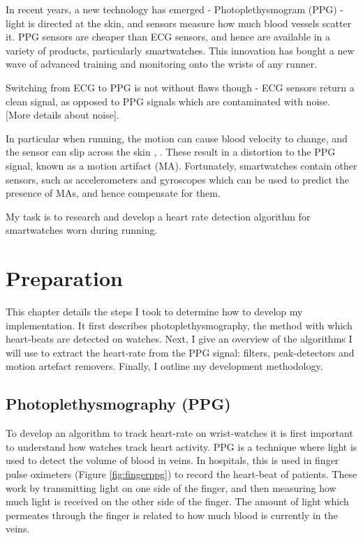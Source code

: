 \documentclass[12pt,a4paper,twoside,openright]{report}
\begin{document}
In recent years, a new technology has emerged - Photoplethysmogram (PPG) 
- light is directed at the skin, and sensors measure how much blood vessels
scatter it. PPG sensors are cheaper than ECG sensors, and hence are 
available in a variety of products, particularly smartwatches. This 
innovation has bought a new wave of advanced training and monitoring onto
the wrists of any runner.

Switching from ECG to PPG is not without flaws though - ECG sensors return a
clean signal, as opposed to PPG signals which are contaminated with
noise. [More details about noise]. 

In particular when running, the motion can cause blood velocity to 
change, and the sensor can slip across the skin \cite{Wijshoff17}, 
\cite{Wood06}. These result in a distortion to the PPG signal, known as a
motion artifact (MA). Fortunately, smartwatches contain other sensors, such
as accelerometers and gyroscopes which can be used to predict the presence of 
MAs, and hence compensate for them.

My task is to research and develop a heart rate detection algorithm
for smartwatches worn during running. 

\chapter{Preparation}

This chapter details the steps I took to determine how to develop my
implementation. It first describes photoplethysmography, the method with which heart-beats are
detected on watches. Next,
I give an overview of the algorithms I will use to extract the heart-rate from
the PPG signal: filters, peak-detectors and motion artefact removers. Finally, I
outline my development methodology.

\section{Photoplethysmography (PPG)}

To develop an algorithm to track heart-rate on wrist-watches it is first important to
understand how watches track heart activity. PPG is a technique where light is
used to detect the volume of blood in veins. In hospitals, this is used in
finger pulse oximeters (Figure \ref{fig:fingerppg}) to record the heart-beat
of patients. These work by transmitting light on one side of the finger, and
then measuring how much light is received on the other side of the finger.
The amount of light which permeates through the finger is related to how much
blood is currently in the veins.
\end{document}
